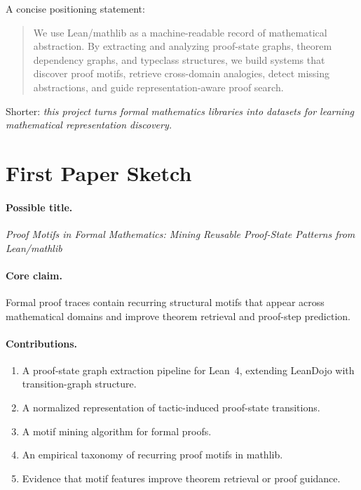 \documentclass[12pt, a4paper]{article}
\begin{document}
A concise positioning statement:

\begin{quote}
We use Lean/mathlib as a machine-readable record of mathematical abstraction.
By extracting and analyzing proof-state graphs, theorem dependency graphs,
and typeclass structures, we build systems that discover proof motifs,
retrieve cross-domain analogies, detect missing abstractions, and guide
representation-aware proof search.
\end{quote}

Shorter: \textit{this project turns formal mathematics libraries into datasets
for learning mathematical representation discovery.}

\section{First Paper Sketch}

\paragraph{Possible title.}
\textit{Proof Motifs in Formal Mathematics: Mining Reusable Proof-State
Patterns from Lean/mathlib}

\paragraph{Core claim.}
Formal proof traces contain recurring structural motifs that appear across
mathematical domains and improve theorem retrieval and proof-step prediction.

\paragraph{Contributions.}
\begin{enumerate}[leftmargin=1.5em]
  \item A proof-state graph extraction pipeline for Lean~4, extending
        LeanDojo \citep{yang2023leandojo} with transition-graph structure.
  \item A normalized representation of tactic-induced proof-state transitions.
  \item A motif mining algorithm for formal proofs.
  \item An empirical taxonomy of recurring proof motifs in mathlib.
  \item Evidence that motif features improve theorem retrieval or proof
        guidance.
\end{enumerate}
\end{document}
